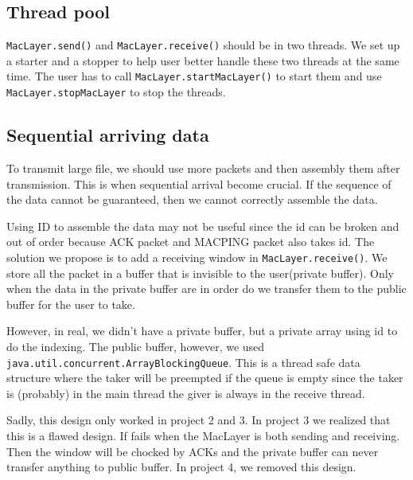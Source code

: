 \documentclass[conference,compsoc]{IEEEtran}
\begin{document}
	\subsection{Thread pool}\label{Thread pool}
		\lstinline{MacLayer.send()} and \lstinline{MacLayer.receive()} should be in two threads. 
		We set up a starter and a stopper to help user better handle these two threads at the same time.
		The user has to call \lstinline{MacLayer.startMacLayer()} to start them and use \lstinline{MacLayer.stopMacLayer} to stop the threads.
	
	\subsection{Sequential arriving data}
		To transmit large file, we should use more packets and then assembly them after transmission. 
		This is when sequential arrival become crucial. If the sequence of the data cannot be guaranteed, then we cannot correctly assemble the data.
		\par  
		Using ID to assemble the data may not be useful since the id can be broken and out of order because ACK packet and MACPING packet also takes id.
		The solution we propose is to add a receiving window in \lstinline{MacLayer.receive()}. 
		We store all the packet in a buffer that is invisible to the user(private buffer). 
		Only when the data in the private buffer are in order do we transfer them to the public buffer for the user to take.
		\par
		However, in real, we didn't have a private buffer, but a private array using id to do the indexing. 
		The public buffer, however, we used \lstinline{java.util.concurrent.ArrayBlockingQueue}.
		This is a thread safe data structure where the taker will be preempted if the queue is empty since the taker is (probably) in the main thread the giver is always in the receive thread.
		\par
		Sadly, this design only worked in project 2 and 3. 
		In project 3 we realized that this is a flawed design. 
		If fails when the MacLayer is both sending and receiving. 
		Then the window will be chocked by ACKs and the private buffer can never transfer anything to public buffer. 
		In project 4, we removed this design.
	
\end{document}
